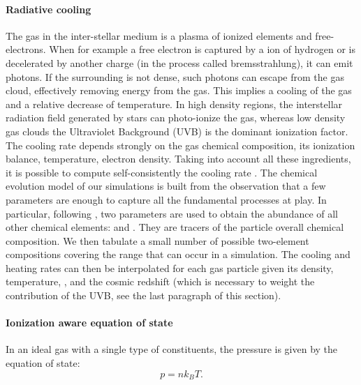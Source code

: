 \paragraph{Radiative cooling}
The gas in the inter-stellar medium is a plasma of ionized elements and free-electrons.
When for example a free electron is captured by a ion of hydrogen or is decelerated by another charge (in the process called bremsstrahlung), it can emit photons.
If the surrounding is not dense, such photons can escape from the gas cloud, effectively removing energy from the gas.
This implies a cooling of the gas and a relative decrease of temperature.
In high density regions, the interstellar radiation field generated by stars can photo-ionize the gas, whereas low density  gas clouds the Ultraviolet Background (UVB) is the dominant ionization factor.
The cooling rate depends strongly on the gas chemical composition, its ionization balance, temperature, electron density.
Taking into account all these ingredients, it is possible to compute self-consistently the cooling rate \citep{Maio2007}.
The chemical evolution model of our simulations is built from the observation that a few parameters are enough to capture all the fundamental processes at play.
In particular, following \citet{DeRijcke2013}, two parameters are used to obtain the abundance of all other chemical elements: \mgfe{} and \feh{}.
They are tracers of the particle overall chemical composition.
We then tabulate a small number of possible two-element compositions covering the range that can occur in a simulation.
The cooling and heating rates can then be interpolated for each gas particle given its density, temperature, \mgfe{}, \feh{} and the cosmic redshift (which is necessary to weight the contribution of the UVB, see the last paragraph of this section).

\paragraph{Ionization aware equation of state} \label{par:new_eos}
In an ideal gas with a single type of constituents, the pressure is given by the equation of state:
\begin{equation}
p = n k_B T.
\end{equation}

